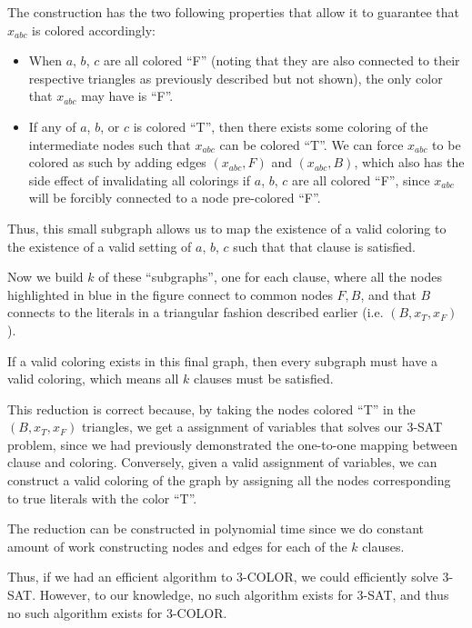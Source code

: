 \documentclass{6046}
\begin{document}
The construction has the two following properties
that allow it to guarantee that $x_{abc}$ is
colored accordingly:
\begin{itemize}
    \item When $a$, $b$, $c$ are all colored ``F'' (noting
    that they are also connected to their respective
    triangles as previously described but not shown),
    the only color that $x_{abc}$ may have is ``F''.
    \item If any of $a$, $b$, or $c$ is colored ``T'',
    then there exists some coloring of the intermediate
    nodes such that $x_{abc}$ can be colored ``T''.
    We can force $x_{abc}$ to be colored as such by adding
    edges $(x_{abc}, F)$ and $(x_{abc}, B)$, which
    also has the side effect of invalidating
    all colorings if $a$, $b$, $c$ are all colored ``F'',
    since $x_{abc}$ will be forcibly connected
    to a node pre-colored ``F''.
\end{itemize}

Thus, this small subgraph allows us to map
the existence of a valid coloring to the existence
of a valid setting of $a$, $b$, $c$ such that
that clause is satisfied.

Now we build $k$ of these ``subgraphs'', one for
each clause, where all the nodes
highlighted in blue in the figure connect to
common nodes $F, B$, and that $B$ connects to
the literals in a triangular fashion described earlier
(i.e. $(B, x_T, x_F)$).

If a valid coloring exists in this final graph, then
every subgraph must have a valid coloring, which means
all $k$ clauses must be satisfied.

This reduction is correct because, by taking
the nodes colored ``T'' in the $(B, x_T, x_F)$
triangles, we get a assignment
of variables that solves our 3-SAT problem, since
we had previously demonstrated the one-to-one mapping
between clause and coloring. Conversely,
given a valid assignment of variables,
we can construct a valid coloring of the graph
by assigning all the nodes corresponding to
true literals with the color ``T''.

The reduction can be constructed in polynomial time since
we do constant amount of work constructing nodes
and edges for each of the $k$ clauses.

Thus, if we had an efficient algorithm to 3-COLOR, we
could efficiently solve 3-SAT. However, to our knowledge,
no such algorithm exists for 3-SAT, and thus
no such algorithm exists for 3-COLOR.
\end{document}
